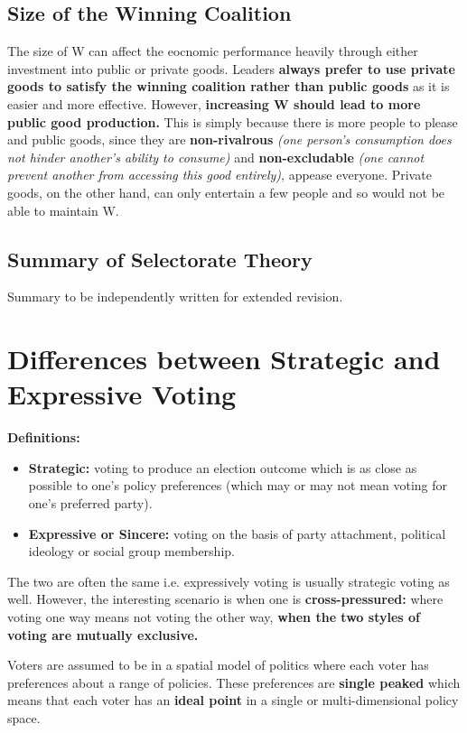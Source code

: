 \documentclass[12pt, letterpaper]{article}
\begin{document}
\subsection{Size of the Winning Coalition}
The size of W can affect the eocnomic performance heavily through either investment into public or private goods. Leaders \textbf{always prefer to use private goods to satisfy the winning coalition rather than public goods} as it is easier and more effective. However, \textbf{increasing W should lead to more public good production.} This is simply because there is more people to please and public goods, since they are \textbf{non-rivalrous} \textit{(one person's consumption does not hinder another's ability to consume)} and \textbf{non-excludable} \textit{(one cannot prevent another from accessing this good entirely)}, appease everyone. Private goods, on the other hand, can only entertain a few people and so would not be able to maintain W.

\subsection{Summary of Selectorate Theory}
Summary to be independently written for extended revision.


\newpage
\section{Differences between Strategic and Expressive Voting}
\textbf{Definitions:}
\begin{itemize}
	\item \textbf{Strategic:} voting to produce an election outcome which is as close as possible to one's policy preferences (which may or may not mean voting for one's preferred party).
	\item \textbf{Expressive or Sincere:} voting on the basis of party attachment, political ideology or social group membership.
\end{itemize}

The two are often the same i.e. expressively voting is usually strategic voting as well. However, the interesting scenario is when one is \textbf{cross-pressured:} where voting one way means not voting the other way, \textbf{when the two styles of voting are mutually exclusive.}

Voters are assumed to be in a spatial model of politics where each voter has preferences about a range of policies. These preferences are \textbf{single peaked} which means that each voter has an \textbf{ideal point} in a single or multi-dimensional policy space.
\end{document}
